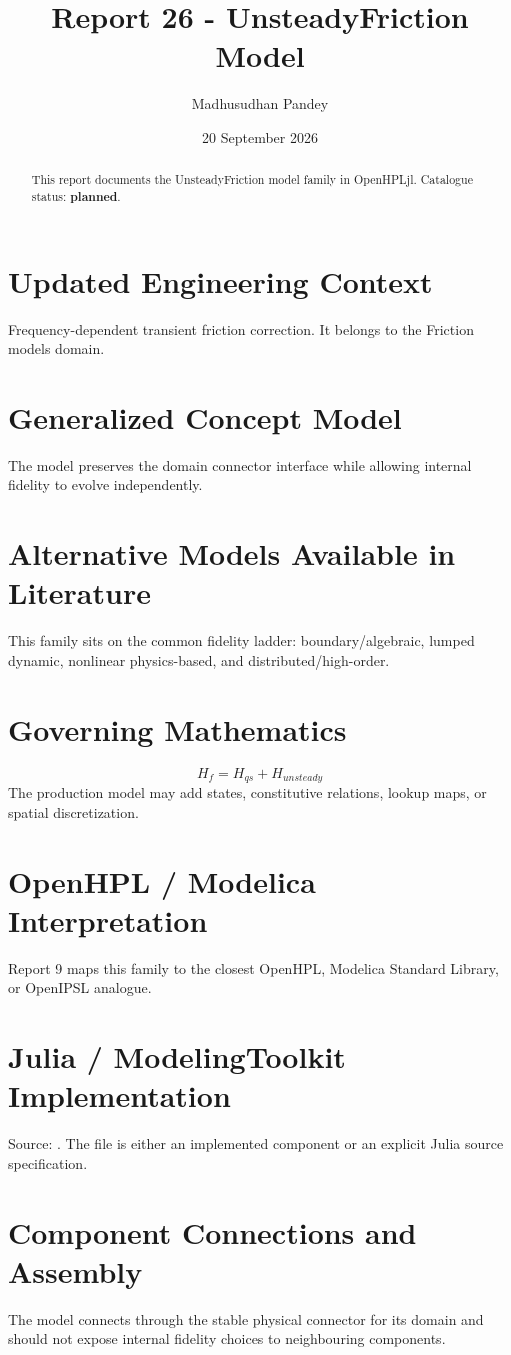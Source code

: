 \documentclass[10pt,a4paper]{article}
\title{Report 26 - UnsteadyFriction Model}
\author{Madhusudhan Pandey}
\date{20 September 2026}
\begin{document}
\maketitle
\begin{abstract}This report documents the UnsteadyFriction model family in OpenHPLjl. Catalogue status: \textbf{planned}.\end{abstract}
\section{Updated Engineering Context}Frequency-dependent transient friction correction. It belongs to the Friction models domain.
\section{Generalized Concept Model}The model preserves the domain connector interface while allowing internal fidelity to evolve independently.
\section{Alternative Models Available in Literature}This family sits on the common fidelity ladder: boundary/algebraic, lumped dynamic, nonlinear physics-based, and distributed/high-order.
\section{Governing Mathematics}\[H_f=H_{qs}+H_{unsteady}\]The production model may add states, constitutive relations, lookup maps, or spatial discretization.
\section{OpenHPL / Modelica Interpretation}Report 9 maps this family to the closest OpenHPL, Modelica Standard Library, or OpenIPSL analogue.
\section{Julia / ModelingToolkit Implementation}Source: \texttt{}. The file is either an implemented component or an explicit Julia source specification.
\section{Component Connections and Assembly}The model connects through the stable physical connector for its domain and should not expose internal fidelity choices to neighbouring components.
\end{document}
